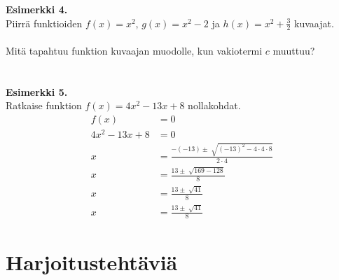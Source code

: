 \textbf{Esimerkki 4.} \\
Piirrä funktioiden $f(x)=x^2$, $g(x)=x^2-2$ ja $h(x)=x^2+\frac{3}{2}$ kuvaajat. \\ \\
Mitä tapahtuu funktion kuvaajan muodolle, kun vakiotermi $c$ muuttuu? \\ \\

\missingfigure \\

\textbf{Esimerkki 5.} \\
Ratkaise funktion $f(x)=4x^2-13x+8$ nollakohdat. 
\begin{align*}
f(x)&=0 \\
4x^2-13x+8&=0 \\
x&=\frac{-(-13) \pm \sqrt[]{(-13)^2-4 \cdot 4 \cdot 8}}{2 \cdot 4} \\
x&=\frac{13 \pm \sqrt[]{169-128}}{8} \\
x&=\frac{13 \pm \sqrt[]{41}}{8} \\
x&=\frac{13 \pm \sqrt[]{41}}{8} 
\end{align*}
\section{Harjoitustehtäviä}
